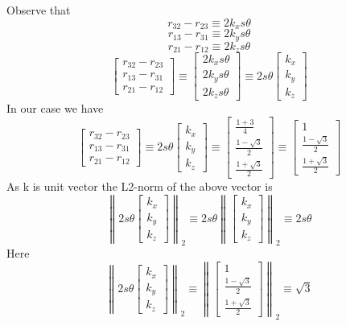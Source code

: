 \documentclass[12pt]{article}
\begin{document}
Observe that
\[
  r_{32} - r_{23} \equiv 2k_xs\theta
\]
\[
  r_{13} - r_{31} \equiv 2k_ys\theta
\]
\[
  r_{21} - r_{12} \equiv 2k_zs\theta
\]
\[
  \begin{bmatrix}
    r_{32} - r_{23}\\
    r_{13} - r_{31}\\
    r_{21} - r_{12}
  \end{bmatrix}
  \equiv
  \begin{bmatrix}
    2k_xs\theta\\
    2k_ys\theta\\
    2k_zs\theta
  \end{bmatrix}
  \equiv
  2s\theta
  \begin{bmatrix}
    k_x\\
    k_y\\
    k_z
  \end{bmatrix}
\]
In our case we have
\[
  \begin{bmatrix}
    r_{32} - r_{23}\\
    r_{13} - r_{31}\\
    r_{21} - r_{12}
  \end{bmatrix}
  \equiv
  2s\theta
  \begin{bmatrix}
    k_x\\
    k_y\\
    k_z
  \end{bmatrix}
  \equiv
  \begin{bmatrix} \frac{1 + 3}{4} \\ \frac{1 - \sqrt{3}}{2} \\ \frac{1 + \sqrt{3}}{2} \end{bmatrix}
  \equiv
  \begin{bmatrix} 1 \\ \frac{1 - \sqrt{3}}{2} \\ \frac{1 + \sqrt{3}}{2} \end{bmatrix}
\]
As k is unit vector the L2-norm of the above vector is
\[
  \left\lVert
  2s\theta
  \begin{bmatrix}
    k_x\\
    k_y\\
    k_z
  \end{bmatrix}
 \right\rVert_2
 \equiv
  2s\theta
  \left\lVert
  \begin{bmatrix}
    k_x\\
    k_y\\
    k_z
  \end{bmatrix}
 \right\rVert_2
 \equiv
 2s\theta
\]
Here
\[
  \left\lVert
  2s\theta
  \begin{bmatrix}
    k_x\\
    k_y\\
    k_z
  \end{bmatrix}
  \right\rVert_2
  \equiv
  \left\lVert
  \begin{bmatrix} 1 \\ \frac{1 - \sqrt{3}}{2} \\ \frac{1 + \sqrt{3}}{2} \end{bmatrix}
  \right\rVert_2
  \equiv
  \sqrt{3}
\]
\end{document}
